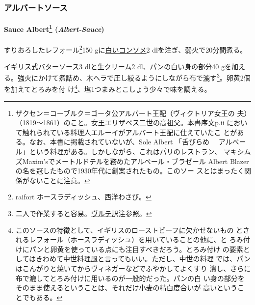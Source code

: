 \begin{recette}
\maeaki

\hypertarget{ux30a2ux30ebux30d0ux30fcux30c8ux30bdux30fcux30b9}{%
\subsubsection{アルバートソース}\label{ux30a2ux30ebux30d0ux30fcux30c8ux30bdux30fcux30b9}}

\hypertarget{albert-sauce}{%
\paragraph[Sauce Albert (\emph{Albert-Sauce})]{\texorpdfstring{Sauce
Albert\footnote{ザクセン＝コーブルク＝ゴータ公アルバート王配（ヴィクトリア女王の
  夫）（1819〜1861）のこと。女王エリザベス二世の高祖父。本書序文p.ii
  において触れられている料理人エルーイがアルバート王配に仕えていたこ
  とがある。なお、本書に掲載されていないが、Sole Albert 「舌びらめ　
  アルベール」という料理がある。しかしながら、これはパリのレストラン、
  マキシムズMaxim'sでメートルドテルを務めたアルベール・ブラゼール Albert
  Blazerの名を冠したもので1930年代に創案されたもの。このソー
  スとはまったく関係がないことに注意。}
(\emph{Albert-Sauce})}{Sauce Albert (Albert-Sauce)}}\label{albert-sauce}}


すりおろしたレフォール\footnote{raifort ホースラディッシュ、西洋わさび。}150
gに\protect\hyperlink{}{白いコンソメ}2 dlを注ぎ、弱火で20分間煮る。

\protect\hyperlink{sauce-au-beurre-a-l-anglaise}{イギリス式バターソース}3
dlと生クリーム2\undemi{} dl、パンの白い身の部分40
gを加える。強火にかけて煮詰め、木ヘラで圧し絞るようにしながら布で漉す\footnote{二人で作業すると容易。\protect\hyperlink{veloute}{ヴルテ}訳注参照。}。卵黄2個を加えてとろみを付
け\footnote{このソースの特徴として、イギリスのローストビーフに欠かせないもの
  とされるレフォール（ホースラディッシュ）を用いていることの他に、と
  ろみ付けにパンと卵黄を使っている点にも注目すべきだろう。とろみ付け
  の要素としてはきわめて中世料理風と言ってもいい。ただし、中世の料理
  では、パンはこんがりと焼いてからヴィネガーなどでふやかしてよくすり
  潰し、さらに布で漉してとろみ付けに用いるのが一般的だった。パンの白
  い身の部分をそのまま使えるということは、それだけ小麦の精白度合いが
  高いということでもある。}、塩1つまみとこしょう少々で味を調える。


\end{recette}
